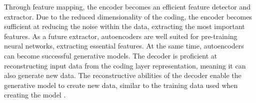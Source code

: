 Through feature mapping, the encoder becomes an efficient feature detector and extractor.
Due to the reduced dimensionality of the coding, the encoder becomes sufficient at reducing the noise within the data, extracting the most important features.
As a future extractor, autoencoders are well suited for pre-training neural networks, extracting essential features.
At the same time, autoencoders can become successful generative models.
The decoder is proficient at reconstructing input data from the coding layer representation, meaning it can also generate new data.
The reconstructive abilities of the decoder enable the generative model to create new data, similar to the training data used when creating the model
\cite[p.~506-508]{Geron2017}.
